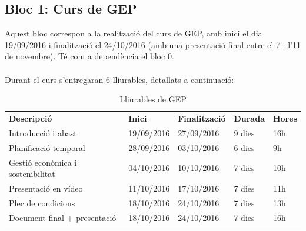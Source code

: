 	\subsection{Bloc 1: Curs de GEP}
		Aquest bloc correspon a la realització del curs de GEP, amb inici el dia 19/09/2016 i finalització el 24/10/2016 (amb una presentació final entre el 7 i l'11 de novembre).
		Té com a dependència el bloc 0.\\\\
		Durant el curs s'entregaran 6 lliurables, detallats a continuació:\\
		\begin{table}[H]
			\begin{center}
				\begin{tabular}{p{5cm} !{\vrule width -1pt}x{2.1cm} !{\vrule width -1pt}x{2.4cm} !{\vrule width -1pt}x{1.6cm} !{\vrule width -1pt}x{1.6cm}}
					\textbf{Descripció} & \textbf{Inici} & \textbf{Finalització} & \textbf{Durada} & \textbf{Hores} \\ %
					Introducció i abast & 19/09/2016 & 27/09/2016 & 9 dies & 16h \\
					Planificació temporal & 28/09/2016 & 03/10/2016 & 6 dies & 9h \\
					Gestió econòmica i sostenibilitat & 04/10/2016 & 10/10/2016 & 7 dies & 10h \\
					Presentació en vídeo & 11/10/2016 & 17/10/2016 & 7 dies & 11h \\
					Plec de condicions & 18/10/2016 & 24/10/2016 & 7 dies & 13h \\
				Document final + presentació & 18/10/2016 & 24/10/2016 & 7 dies & 16h
				\end{tabular}
			\end{center}
			\caption{Lliurables de GEP}
		\end{table}


